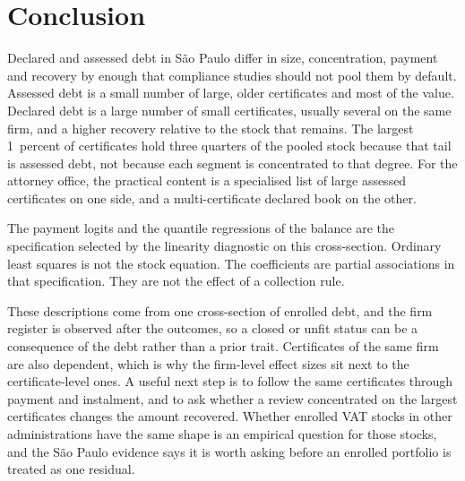 \section{Conclusion}\label{sec:conclusion}

Declared and assessed \vat{} debt in S\~ao Paulo differ in size, concentration, payment and recovery by enough that compliance studies should not pool them by default.
Assessed debt is a small number of large, older certificates and most of the value.
Declared debt is a large number of small certificates, usually several on the same firm, and a higher recovery relative to the stock that remains.
The largest 1~percent of certificates hold three quarters of the pooled stock because that tail is assessed debt, not because each segment is concentrated to that degree.
For the attorney office, the practical content is a specialised list of large assessed certificates on one side, and a multi-certificate declared book on the other.

The payment logits and the quantile regressions of the balance are the specification selected by the linearity diagnostic on this cross-section.
Ordinary least squares is not the stock equation.
The coefficients are partial associations in that specification.
They are not the effect of a collection rule.

These descriptions come from one cross-section of enrolled debt, and the firm register is observed after the outcomes, so a closed or unfit status can be a consequence of the debt rather than a prior trait.
Certificates of the same firm are also dependent, which is why the firm-level effect sizes sit next to the certificate-level ones.
A useful next step is to follow the same certificates through payment and instalment, and to ask whether a review concentrated on the largest certificates changes the amount recovered.
Whether enrolled VAT stocks in other administrations have the same shape is an empirical question for those stocks, and the S\~ao Paulo evidence says it is worth asking before an enrolled portfolio is treated as one residual.
